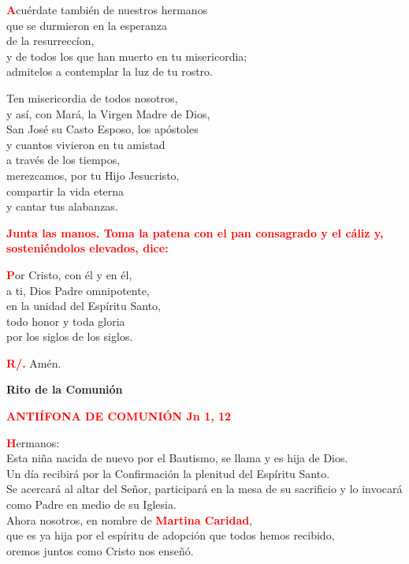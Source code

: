 \documentclass[12pt, letterpaper]{report}
\begin{document}
\lettrine[lines=1]{\bfseries \textcolor{red}{A}}{}\Large cu\'erdate tambi\'en de nuestros hermanos\\
que se durmieron en la esperanza\\
de la resurrecc\'ion,\\
y de todos los que han muerto en tu misericordia;\\
admitelos a contemplar la luz de tu rostro.\newline

Ten misericordia de todos nosotros,\\
y as\'i, con Mar\'a, la Virgen Madre de Dios,\\
San Jos\'e su Casto Esposo, los ap\'ostoles\\
y cuantos vivieron en tu amistad\\
a trav\'es de los tiempos,\\
merezcamos, por tu Hijo Jesucristo,\\
compartir la vida eterna\\
y cantar tus alabanzas. \newline

\newpage


\large{\bfseries \textcolor{red}{Junta las manos. Toma la patena con el pan consagrado y el c\'aliz y, sosteni\'endolos elevados, dice:}}

\lettrine[lines=1]{\bfseries \textcolor{red}{P}}{}\Large or Cristo, con \'el y en \'el,\\
a ti, Dios Padre omnipotente,\\
en la unidad del Esp\'iritu Santo,\\
todo honor y toda gloria\\
por los siglos de los siglos.\newline

\Large \hspace{-0.9cm} {\bfseries \textcolor{red}{R/.}} \hspace{0.5cm} Am\'en.


\begin{center}
\Huge {\bfseries Rito de la Comuni\'on}
\end{center}

\Large {\bfseries \textcolor{red}{ANTI\'IFONA DE COMUNI\'ON \hspace{2cm} Jn 1, 12}}

\lettrine[lines=1]{\bfseries \textcolor{red}{H}}{}\Large ermanos: \\
Esta ni\~na nacida de nuevo por el Bautismo, se llama y es hija de Dios. \\
Un d\'ia recibir\'a por la Confirmaci\'on la plenitud del Esp\'iritu Santo. \\
Se acercar\'a al altar del Se\~nor, participar\'a en la mesa de su sacrificio y lo invocar\'a como Padre en medio de su Iglesia. \\
Ahora nosotros, en nombre de {\bfseries \textcolor{red}{Martina Caridad}}, \\
que es ya hija por el esp\'iritu de adopci\'on que todos hemos recibido, \\
oremos juntos como Cristo nos ense\~n\'o. \newline
\end{document}
